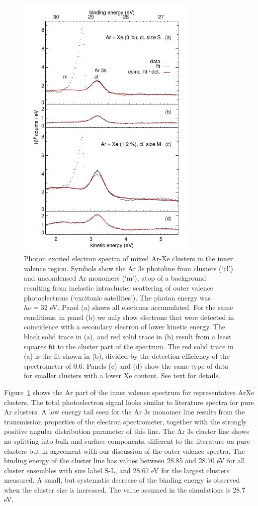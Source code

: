 \begin{figure}[ht]
 \centering
 \includegraphics[width=8.8cm]{pics/figure_ival.pdf}
 \caption{
Photon excited electron spectra of mixed Ar-Xe clusters in the inner valence region.
Symbols show the Ar 3s photoline from clusters (`cl') and uncondensed Ar monomers (`m'), atop of a background resulting from inelastic intracluster scattering of outer valence photoelectrons (`excitonic satellites').\protect\cite{hergenhahn2002}
The photon energy was $h\nu = 32$ eV.
Panel (a) shows all electrons accumulated.
For the same conditions, in panel (b) we only show electrons that were detected in coincidence with a secondary electron of lower kinetic energy.
The black solid trace in (a), and red solid trace in (b) result from a least squares fit to the cluster part of the spectrum. 
The red solid trace in (a) is the fit shown in (b), divided by the detection efficiency of the spectrometer of 0.6.
Panels (c) and (d) show the same type of data for smaller clusters with a lower Xe content.
See text for details.
\label{figure:ival}
}
\end{figure}

Figure\ \ref{figure:ival} shows the Ar part of the inner valence spectrum for representative ArXe clusters. 
The total photoelectron signal looks similar to literature spectra for pure Ar clusters.\cite{feifel,zhang} 
A low energy tail seen for the Ar 3s monomer line results from the transmission properties of the electron spectrometer, together with the strongly positive angular distribution parameter of this line.\cite{zhang,kruit}
The Ar 3s cluster line shows no splitting into bulk and surface components, different to the literature on pure clusters but in agreement with our discussion of the outer valence spectra. 
The binding energy of the cluster line has values between 28.85 and 28.70 eV for all cluster ensembles with size label S-L, and 28.67 eV for the largest clusters measured. 
A small, but systematic decrease of the binding energy is observed when the cluster size is increased. 
The value assumed in the simulations is 28.7 eV.

